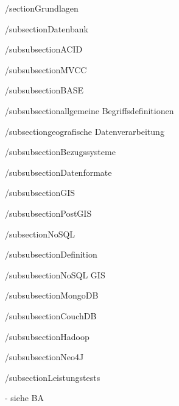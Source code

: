 /section{Grundlagen}


/subsection{Datenbank}

/subsubsection{ACID}

/subsubsection{MVCC}

/subsubsection{BASE}

/subsubsection{allgemeine Begriffsdefinitionen}


/subsection{geografische Datenverarbeitung}

/subsubsection{Bezugssysteme}

/subsubsection{Datenformate}

/subsubsection{GIS}

/subsubsection{PostGIS}



/subsection{NoSQL}

/subsubsection{Definition}

/subsubsection{NoSQL GIS}

/subsubsection{MongoDB}

/subsubsection{CouchDB}

/subsubsection{Hadoop}

/subsubsection{Neo4J}


/subsection{Leistungstests}

- siehe BA